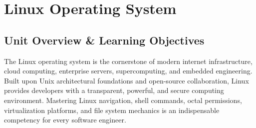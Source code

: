 \chapter{Linux Operating System}
\label{chap:linux-operating-system}

\section{Unit Overview \& Learning Objectives}

The Linux operating system is the cornerstone of modern internet infrastructure, cloud computing, enterprise servers, supercomputing, and embedded engineering. Built upon Unix architectural foundations and open-source collaboration, Linux provides developers with a transparent, powerful, and secure computing environment. Mastering Linux navigation, shell commands, octal permissions, virtualization platforms, and file system mechanics is an indispensable competency for every software engineer.

